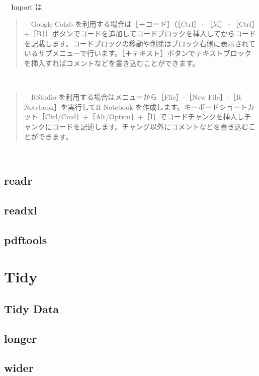\documentclass[
  12pt,
]{book}
\begin{document}
　Import は

\begin{quote}
　Google Colab を利用する場合は［＋コード］（［Ctrl］+［M］+［Ctrl］+［B］）ボタンでコードを追加してコードブロックを挿入してからコードを記載します。コードブロックの移動や削除はブロック右側に表示されているサブメニューで行います。［＋テキスト］ボタンでテキストブロックを挿入すればコメントなどを書き込むことができます。
\end{quote}

　

\begin{quote}
　RStudio を利用する場合はメニューから［File］-［New File］-［R Notebook］を実行してR Notebook を作成します。キーボードショートカット［Ctrl/Cmd］+［Alt/Option］+［I］でコードチャンクを挿入しチャンクにコードを記述します。チャング以外にコメントなどを書き込むことができます。
\end{quote}

　

\hypertarget{readr}{%
\section{readr}\label{readr}}

\hypertarget{readxl}{%
\section{readxl}\label{readxl}}

\hypertarget{pdftools}{%
\section{pdftools}\label{pdftools}}

\hypertarget{tidy-1}{%
\chapter{Tidy}\label{tidy-1}}

\hypertarget{tidy-data}{%
\section{Tidy Data}\label{tidy-data}}

\hypertarget{longer}{%
\section{longer}\label{longer}}

\hypertarget{wider}{%
\section{wider}\label{wider}}
\end{document}
